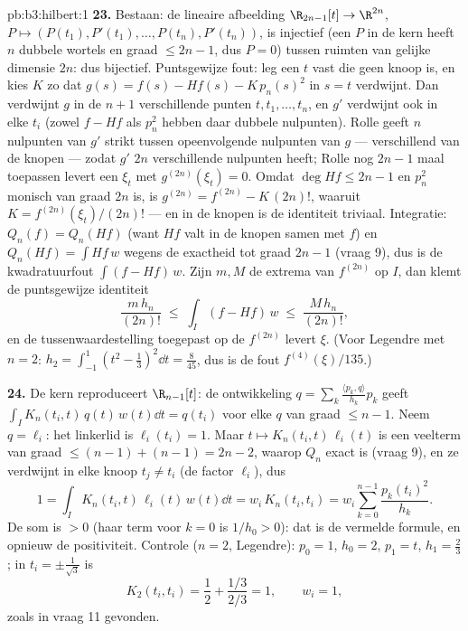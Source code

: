\begin{solution}{pb:b3:hilbert:1}
\textbf{23.} Bestaan: de lineaire afbeelding $\R_{2n-1}[t] \to
\R^{2n}$, $P \mapsto (P(t_1), P'(t_1), \dots, P(t_n),
P'(t_n))$, is injectief (een $P$ in de kern heeft $n$ dubbele
wortels en graad $\leq 2n - 1$, dus $P = 0$) tussen ruimten van
gelijke dimensie $2n$: dus bijectief. Puntsgewijze fout: leg een
$t$ vast die geen knoop is, en kies $K$ zo dat $g(s) = f(s) -
Hf(s) - K\,p_n(s)^2$ in $s = t$ verdwijnt. Dan verdwijnt $g$ in
de $n + 1$ verschillende punten $t, t_1, \dots, t_n$, en $g'$
verdwijnt ook in elke $t_i$ (zowel $f - Hf$ als $p_n^2$ hebben
daar dubbele nulpunten). Rolle geeft $n$ nulpunten van $g'$
strikt tussen opeenvolgende nulpunten van $g$ --- verschillend
van de knopen --- zodat $g'$ $2n$ verschillende nulpunten heeft;
Rolle nog $2n - 1$ maal toepassen levert een $\xi_t$ met
$g^{(2n)}(\xi_t) = 0$. Omdat $\deg Hf \leq 2n - 1$ en $p_n^2$
monisch van graad $2n$ is, is $g^{(2n)} = f^{(2n)} - K\,(2n)!$,
waaruit $K = f^{(2n)}(\xi_t)/(2n)!$ --- en in de knopen is de
identiteit triviaal. Integratie: $Q_n(f) = Q_n(Hf)$ (want $Hf$
valt in de knopen samen met $f$) en $Q_n(Hf) = \int Hf\,w$ wegens
de exactheid tot graad $2n - 1$ (vraag 9), dus is de
kwadratuurfout $\int(f - Hf)\,w$. Zijn $m, M$ de extrema van
$f^{(2n)}$ op $I$, dan klemt de puntsgewijze identiteit
\[
\frac{m\,h_n}{(2n)!} \;\leq\; \int_I(f - Hf)\,w
\;\leq\; \frac{M\,h_n}{(2n)!} ,
\]
en de tussenwaardestelling toegepast op de  $f^{(2n)}$
levert $\xi$. (Voor Legendre met $n = 2$: $h_2 = \int_{-1}^1(t^2
- \frac13)^2\dd t = \frac8{45}$, dus is de fout
$f^{(4)}(\xi)/135$.)

\textbf{24.} De kern reproduceert $\R_{n-1}[t]$: de ontwikkeling
$q = \sum_k\frac{\langle p_k, q\rangle}{h_k}p_k$ geeft $\int_I
K_n(t_i, t)\,q(t)\,w(t)\dd t = q(t_i)$ voor elke $q$ van graad
$\leq n - 1$. Neem $q = \ell_i$: het linkerlid is $\ell_i(t_i) =
1$. Maar $t \mapsto K_n(t_i, t)\,\ell_i(t)$ is een veelterm van
graad $\leq (n - 1) + (n - 1) = 2n - 2$, waarop $Q_n$ exact is
(vraag 9), en ze verdwijnt in elke knoop $t_j \neq t_i$ (de
factor $\ell_i$), dus
\[
1 = \int_I K_n(t_i, t)\,\ell_i(t)\,w(t)\dd t
= w_i\,K_n(t_i, t_i)
= w_i\sum_{k=0}^{n-1}\frac{p_k(t_i)^2}{h_k} .
\]
De som is $> 0$ (haar term voor $k = 0$ is $1/h_0 > 0$): dat is de
vermelde formule, en opnieuw de positiviteit. Controle ($n = 2$,
Legendre): $p_0 = 1$, $h_0 = 2$, $p_1 = t$, $h_1 = \frac23$; in
$t_i = \pm\frac1{\sqrt3}$ is
\[
K_2(t_i, t_i) = \frac12 + \frac{1/3}{2/3} = 1,
\qquad w_i = 1,
\]
zoals in vraag 11 gevonden.


\end{solution}
